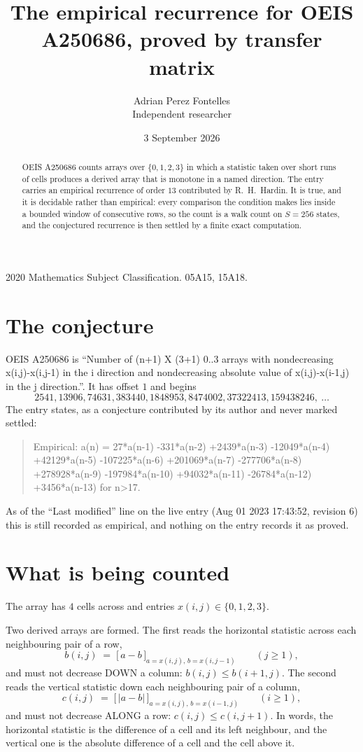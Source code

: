 \documentclass[11pt,a4paper]{article}
\title{The empirical recurrence for OEIS A250686, proved by transfer matrix}
\author{Adrian Perez Fontelles\\ \small Independent researcher}
\date{3 September 2026}
\theoremstyle{plain}
\theoremstyle{definition}
\begin{document}
\maketitle

\begin{abstract}
OEIS A250686 counts arrays over $\{0,1,2,3\}$ in which a statistic taken over short runs
of cells produces a derived array that is monotone in a named direction. The entry carries an
empirical recurrence of order $13$ contributed by R.~H.~Hardin. It is true, and it is
decidable rather than empirical: every comparison the condition makes lies inside a bounded
window of consecutive rows, so the count is a walk count on $S=256$ states, and the
conjectured recurrence is then settled by a finite exact computation.
\end{abstract}

\noindent\small 2020 Mathematics Subject Classification. 05A15, 15A18.\normalsize

\section{The conjecture}

OEIS A250686 is ``Number of (n+1) X (3+1) 0..3 arrays with nondecreasing x(i,j)-x(i,j-1) in the i direction and nondecreasing absolute value of x(i,j)-x(i-1,j) in the j direction.''. It has offset $1$ and begins
\[
2541, 13906, 74631, 383440, 1848953, 8474002, 37322413, 159438246,\ \dots
\]
The entry states, as a conjecture contributed by its author and never marked settled:
\begin{quote}
Empirical: a(n) = 27*a(n-1) -331*a(n-2) +2439*a(n-3) -12049*a(n-4) +42129*a(n-5) -107225*a(n-6) +201069*a(n-7) -277706*a(n-8) +278928*a(n-9) -197984*a(n-10) +94032*a(n-11) -26784*a(n-12) +3456*a(n-13) for n>17.
\end{quote}
As of the ``Last modified'' line on the live entry (Aug 01 2023 17:43:52, revision 6) this is still
recorded as empirical, and nothing on the entry records it as proved.

\section{What is being counted}

The array has $4$ cells across and entries $x(i,j)\in\{0,1,2,3\}$.

Two derived arrays are formed. The first reads the horizontal statistic across each
neighbouring pair of a row,
\[
b(i,j)\;=\;\bigl[\,a-b\,\bigr]_{a=x(i,j),\,b=x(i,j-1)}\qquad (j\ge1),
\]
and must not decrease DOWN a column: $b(i,j)\le b(i{+}1,j)$. The second reads the vertical
statistic down each neighbouring pair of a column,
\[
c(i,j)\;=\;\bigl[\,\lvert a-b\rvert\,\bigr]_{a=x(i,j),\,b=x(i{-}1,j)}\qquad (i\ge1),
\]
and must not decrease ALONG a row: $c(i,j)\le c(i,j{+}1)$. In words, the horizontal statistic
is the difference of a cell and its left neighbour, and the vertical one is
the absolute difference of a cell and the cell above it.
\end{document}
